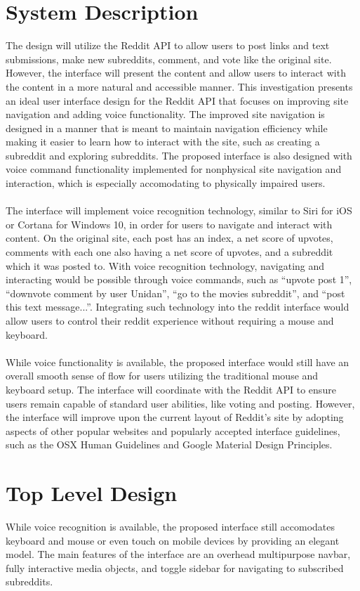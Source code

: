 \documentclass{article}
\begin{document}
\section{System Description} The design will utilize the Reddit API to allow users to post links and text submissions, make new subreddits, comment, and vote like the original site. However, the interface will present the content and allow users to interact with the content in a more natural and accessible manner. This investigation presents an ideal user interface design for the Reddit API that focuses on improving site navigation and adding voice functionality. The improved site navigation is designed in a manner that is meant to maintain navigation efficiency while making it easier to learn how to interact with the site, such as creating a subreddit and exploring subreddits. The proposed interface is also designed with voice command functionality implemented for nonphysical site navigation and interaction, which is especially accomodating to physically impaired users.\\
\\
\indent The interface will implement voice recognition technology, similar to Siri for iOS or Cortana for Windows 10, in order for users to navigate and interact with content. On the original site, each post has an index, a net score of upvotes, comments with each one also having a net score of upvotes, and a subreddit which it was posted to. With voice recognition technology, navigating and interacting would be possible through voice commands, such as ``upvote post 1'', ``downvote comment by user Unidan'', ``go to the movies subreddit'', and ``post this text message...''. Integrating such technology into the reddit interface would allow users to control their reddit experience without requiring a mouse and keyboard.\\
\\
\indent While voice functionality is available, the proposed interface would still have an overall smooth sense of flow for users utilizing the traditional mouse and keyboard setup. The interface will coordinate with the Reddit API to ensure users remain capable of standard user abilities, like voting and posting. However, the interface will improve upon the current layout of Reddit's site by adopting aspects of other popular websites and popularly accepted interface guidelines, such as the OSX Human Guidelines and Google Material Design Principles.

\section{Top Level Design} While voice recognition is available, the proposed interface still accomodates keyboard and mouse or even touch on mobile devices by providing an elegant model. The main features of the interface are an overhead multipurpose navbar, fully interactive media objects, and toggle sidebar for navigating to subscribed subreddits.
\end{document}
